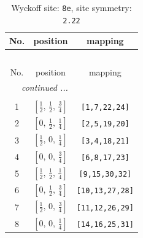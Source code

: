 \documentclass[fleqn,8pt]{jsarticle}
\begin{document}
\renewcommand{\arraystretch}{1.2}
\begin{longtable}{ccc}
\caption{Wyckoff site: {\tt 8e}, site symmetry: {\tt 2.22}}
 \\
 \hline \hline
No. & position & mapping \\ \hline \endfirsthead

\multicolumn{2}{l}{\tablename\ \thetable{}} \\
 \hline \hline
No. & position & mapping \\ \hline \endhead

 \hline \hline
\multicolumn{2}{r}{\footnotesize\it continued ...} \\ \endfoot

 \hline \hline
\multicolumn{2}{r}{} \\ \endlastfoot

1 & $\left[ \frac{1}{2},\, \frac{1}{2},\, \frac{3}{4} \right]$ & {\tt [1,7,22,24]} \\ \hline
2 & $\left[ 0,\, \frac{1}{2},\, \frac{1}{4} \right]$ & {\tt [2,5,19,20]} \\ \hline
3 & $\left[ \frac{1}{2},\, 0,\, \frac{1}{4} \right]$ & {\tt [3,4,18,21]} \\ \hline
4 & $\left[ 0,\, 0,\, \frac{3}{4} \right]$ & {\tt [6,8,17,23]} \\ \hline
5 & $\left[ \frac{1}{2},\, \frac{1}{2},\, \frac{1}{4} \right]$ & {\tt [9,15,30,32]} \\ \hline
6 & $\left[ 0,\, \frac{1}{2},\, \frac{3}{4} \right]$ & {\tt [10,13,27,28]} \\ \hline
7 & $\left[ \frac{1}{2},\, 0,\, \frac{3}{4} \right]$ & {\tt [11,12,26,29]} \\ \hline
8 & $\left[ 0,\, 0,\, \frac{1}{4} \right]$ & {\tt [14,16,25,31]} \\
\end{longtable}
\renewcommand{\arraystretch}{1.2}
\end{document}
